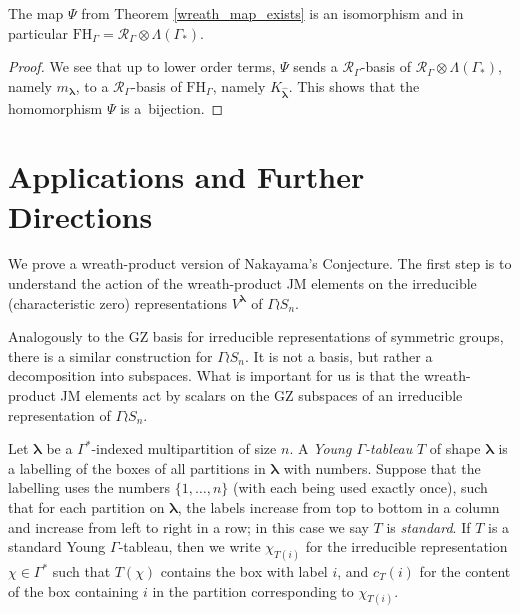\documentclass[ALCO,Unicode]{cedram}
\newcommand{\bs}{\boldsymbol}
\newcommand{\RGamma}{\mathcal{R}_{\Gamma}}
\newcommand{\LambdaG}{\Lambda(\Gamma_*)}
\newcommand{\FHG}{\mathrm{FH}_{\Gamma}}
\newcommand{\RGamma}{\mathcal{R}_{\Gamma}}
\newcommand{\LambdaG}{\Lambda(\Gamma_*)}
\newcommand{\FHG}{\mathrm{FH}_{\Gamma}}
\begin{document}
\begin{theorem} \label{main_thm}
The map $\Psi$ from Theorem \ref{wreath_map_exists} is an isomorphism and in particular $\FHG = \RGamma \otimes \LambdaG$.
\end{theorem}

\begin{proof}
We see that up to lower order terms, $\Psi$ sends a $\RGamma$-basis of $\RGamma \otimes \LambdaG$, namely $m_{\bs\lambda}$, to a $\RGamma$-basis of $\FHG$, namely $K_{\bm\hat{\bs\lambda}}$. This shows that the homomorphism $\Psi$ is a~bijection.
\end{proof}

\section{Applications and Further Directions} \label{applications_section}

We prove a wreath-product version of Nakayama's Conjecture. The first step is to understand the action of the wreath-product JM elements on the irreducible (characteristic zero) representations $V^{\bs\lambda}$ of $\Gamma \wr S_n$.

Analogously to the GZ basis for irreducible representations of symmetric groups, there is a similar construction for $\Gamma \wr S_n$. It is not a basis, but rather a decomposition into subspaces. What is important for us is that the wreath-product JM elements act by scalars on the GZ subspaces of an irreducible representation of $\Gamma \wr S_n$.

\begin{definition}[{\cite[Section 1]{MS}}]
Let $\bs\lambda$ be a $\Gamma^*$-indexed multipartition of size $n$. 
A \emph{Young $\Gamma$-tableau} $T$ of shape $\bs\lambda$ is a labelling of the boxes of all partitions in $\bs\lambda$ with numbers. Suppose that the labelling uses the numbers $\{1, \ldots, n\}$ \textup{(}with each being used exactly once\textup{)}, such that for each partition on $\bs\lambda$, the labels increase from top to bottom in a column and increase from left to right in a row; in this case we say $T$ is \emph{standard}. 
If $T$ is a standard Young $\Gamma$-tableau, then we write $\chi_{T(i)}$ for the irreducible representation $\chi \in \Gamma^*$ such that $T(\chi)$ contains the box with label $i$, and $c_T(i)$ for the content of the box containing $i$ in the partition corresponding to $\chi_{T(i)}$.
\end{definition}
\end{document}
